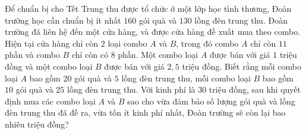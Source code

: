 \begin{bt}%
	Để chuẩn bị cho Tết Trung thu được tổ chức ở một lớp học tình thương, Đoàn trường học cần chuẩn bị ít nhất $160$ gói quà và $130$ lồng đèn trung thu. Đoàn trường đã liên hệ đến một cửa hàng, và được cửa hàng đề xuất mua theo combo. Hiện tại cửa hàng chỉ còn $2$ loại combo $A$ và $B$, trong đó combo $A$ chỉ còn $11$ phần và combo $B$ chỉ còn có $8$ phần. Một combo loại $A$ được bán với giá $1$ triệu đồng và một combo loại $B$ được bán với giá $2{,}5$ triệu đồng. Biết rằng mỗi combo loại $A$ bao gồm $20$ gói quà và $5$ lồng đèn trung thu, mỗi combo loại $B$ bao gồm $10$ gói quà và $25$ lồng đèn trung thu. Với kinh phí là $30$ triệu đồng, sau khi quyết định mua các combo loại $A$ và $B$ sao cho vừa đảm bảo số lượng gói quà và lồng đèn trung thu đã đề ra, vừa tốn ít kinh phí nhất, Đoàn trường sẽ còn lại bao nhiêu triệu đồng?
\end{bt}
